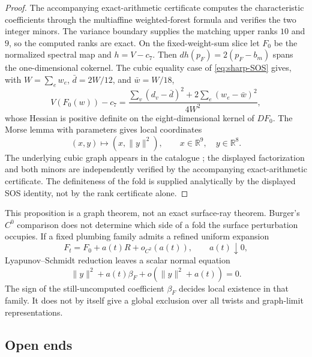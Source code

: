 \documentclass[11pt,reqno]{amsart}
\theoremstyle{definition}
\theoremstyle{remark}
\newcommand{\R}{\mathbb R}
\begin{document}
\begin{proof}
The accompanying exact-arithmetic certificate computes the characteristic
coefficients through the multiaffine weighted-forest formula and verifies the
two integer minors.  The variance boundary supplies the matching upper ranks
$10$ and $9$, so the computed ranks are exact.  On the fixed-weight-sum
slice let $F_0$ be the normalized spectral map and $h=V-c_7$.  Then
$dh(p_F)=2(p_F-b_m)$ spans the one-dimensional cokernel.  The cubic equality
case of \eqref{eq:sharp-SOS} gives, with
$W=\sum_e w_e$, $\bar d=2W/12$, and $\bar w=W/18$,
\[
 V(F_0(w))-c_7=
 \frac{\sum_v(d_v-\bar d)^2+2\sum_e(w_e-\bar w)^2}{4W^2},
\]
whose Hessian is positive definite on the eight-dimensional kernel of
$DF_0$.  The Morse lemma with parameters gives local coordinates
\[
 (x,y)\longmapsto(x,\|y\|^2),
 \qquad x\in\R^9,\quad y\in\R^8.
\]
The underlying cubic graph appears in the catalogue
\cite{BussemakerCobeljicCvetkovicSeidel1976}; the displayed factorization and
both minors are independently verified by the accompanying exact-arithmetic
certificate.  The definiteness of the fold is supplied analytically by the
displayed SOS identity, not by the rank certificate alone.
\end{proof}

This proposition is a graph theorem, not an exact surface-ray theorem.
Burger's $C^0$ comparison does not determine which side of a fold the
surface perturbation occupies.  If a fixed plumbing family admits a refined
uniform expansion
\[
 F_t=F_0+a(t)R+o_{C^2}(a(t)),\qquad a(t)\downarrow0,
\]
Lyapunov--Schmidt reduction leaves a scalar normal equation
\[
 \|y\|^2+a(t)\beta_F+o(\|y\|^2+a(t))=0.
\]
The sign of the still-uncomputed coefficient $\beta_F$ decides local
existence in that family.  It does not by itself give a global exclusion
over all twists and graph-limit representations.

\subsection{Open ends}
\end{document}
